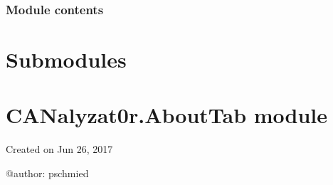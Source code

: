 \documentclass[letterpaper,10pt,english]{sphinxmanual}
\begin{document}
\subsubsection{Module contents}
\label{\detokenize{src.ui:module-src.ui}}\label{\detokenize{src.ui:module-contents}}

\section{Submodules}
\label{\detokenize{src:submodules}}

\section{CANalyzat0r.AboutTab module}
\label{\detokenize{src:canalyzat0r-abouttab-module}}\label{\detokenize{src:module-src.AboutTab}}
Created on Jun 26, 2017

@author: pschmied
\end{document}

